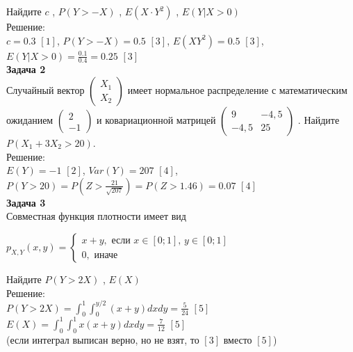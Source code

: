 \documentclass[pdftex,12pt,a4paper]{article}
\begin{document}
Найдите  $c$ ,  $P\left(Y>-X\right)$ ,  $E\left(X\cdot Y^{2}
\right)$ ,  $E\left(Y|X>0\right)$ \\
Решение: \\
$c=0.3$ $[1]$, $P(Y>-X)=0.5$ $[3]$, $E(XY^{2})=0.5$ $[3]$,
$E(Y|X>0)=\frac{0.1}{0.4}=0.25$ $[3]$ \\

\textbf{Задача 2} \\ %
Случайный вектор  $\left(\begin{array}{c}
{X_{1} } \\ {X_{2} }
\end{array}\right)$  имеет нормальное распределение с
математическим ожиданием  $\left(\begin{array}{c} {2} \\ {-1}
\end{array}\right)$  и ковариационной матрицей
$\left(\begin{array}{cc} {9} & {-4,5} \\ {-4,5} & {25}
\end{array}\right)$ . Найдите  $P\left(X_{1} +3X_{2} >20\right)$.
\\
Решение: \\
$E(Y)=-1$ $[2]$, $Var(Y)=207$ $[4]$,
$P(Y>20)=P(Z>\frac{21}{\sqrt{207}})=P(Z>1.46)=0.07$ $[4]$ \\

\textbf{Задача 3} \\ %
Совместная функция плотности имеет вид

$p_{X,Y} \left(x,y\right)=\left\{\begin{array}{l} {x+y,
\text{ если } x\in \left[0;1\right],\, y\in \left[0;1\right]} \\
{0,\text{ иначе} } \end{array}\right. $

Найдите  $P\left(Y>2X\right)$ ,  $E\left(X\right)$ \\
Решение: \\
$P(Y>2X)=\int_{0}^{1}\int_{0}^{y/2}(x+y)dxdy=\frac{5}{24}$ $[5]$\\
$E(X)=\int_{0}^{1}\int_{0}^{1}x(x+y)dxdy=\frac{7}{12}$ $[5]$\\
(если интеграл выписан верно, но не взят, то $[3]$ вместо $[5]$)
\\
\end{document}

